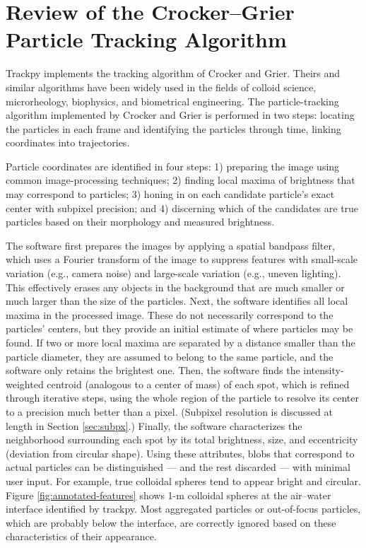\section{Review of the Crocker--Grier Particle Tracking Algorithm}

Trackpy implements the tracking algorithm of Crocker and Grier\cite{Crocker1996}. Theirs and similar algorithms\cite{Ghosh1994} have been widely used in the fields of colloid science, microrheology, biophysics, and biometrical engineering. The particle-tracking algorithm implemented by Crocker and Grier is performed in two steps: locating the particles in each frame and identifying the particles through time, linking coordinates into trajectories.

Particle coordinates are identified in four steps: 1) preparing the image using common image-processing techniques; 2) finding local maxima of brightness that may correspond to particles; 3) honing in on each candidate particle's exact center with subpixel precision; and 4) discerning which of the candidates are true particles based on their morphology and measured brightness.

The software first prepares the images by applying a spatial bandpass filter, which uses a Fourier transform of the image to suppress features with small-scale variation (e.g., camera noise) and large-scale variation (e.g., uneven lighting). This effectively erases any objects in the background that are much smaller or much larger than the size of the particles. Next, the software identifies all local maxima in the processed image. These do not necessarily correspond to the particles' centers, but they provide an initial estimate of where particles may be found. If two or more local maxima are separated by a distance smaller than the particle diameter, they are assumed to belong to the same particle, and the software only retains the brightest one. Then, the software finds the intensity-weighted centroid (analogous to a center of mass) of each spot, which is refined through iterative steps, using the whole region of the particle to resolve its center to a precision much better than a pixel. (Subpixel resolution is discussed at length in Section \ref{sec:subpx}.) Finally, the software characterizes the neighborhood surrounding each spot by its total brightness, size, and eccentricity (deviation from circular shape). Using these attributes, blobs that correspond to actual particles can be distinguished --- and the rest discarded --- with minimal user input. For example, true colloidal spheres tend to appear bright and circular. Figure \ref{fig:annotated-features} shows 1-\textmu m colloidal spheres at the air--water interface identified by trackpy. Most aggregated particles or out-of-focus particles, which are probably below the interface, are correctly ignored based on these characteristics of their appearance.

